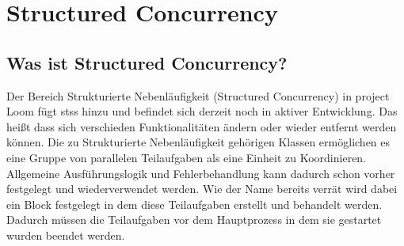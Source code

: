 \section{Structured Concurrency}                                 %
\label{sec:Structured Concurrency}


\subsection{Was ist Structured Concurrency?}
\label{subsec:WasistSC?}
    Der Bereich Strukturierte Nebenläufigkeit (Structured Concurrency) in project Loom fügt \Glspl{sts} hinzu und befindet sich derzeit noch in
    aktiver Entwicklung. Das heißt dass sich verschieden Funktionalitäten ändern oder wieder entfernt werden können.
    Die zu Strukturierte Nebenläufigkeit gehörigen Klassen ermöglichen
    es eine Gruppe von parallelen Teilaufgaben als eine Einheit zu Koordinieren. Allgemeine Ausführungslogik und Fehlerbehandlung kann dadurch schon vorher festgelegt und 
    wiederverwendet werden.
    Wie der Name bereits verrät wird dabei ein Block festgelegt in dem diese Teilaufgaben erstellt und behandelt werden.
    Dadurch müssen die Teilaufgaben vor dem Hauptprozess in dem sie gestartet wurden beendet werden.
    \cite{oracle21SC}

